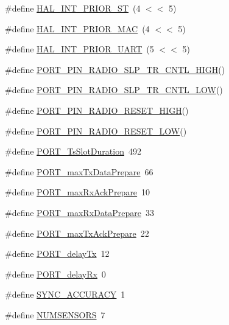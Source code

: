 \begin{DoxyCompactItemize}
\item 
\#define \hyperlink{_open_mote-_c_c2538_2board__info_8h_ac44de6592dd31fb9dca9d1a954bcc1b7}{H\+A\+L\+\_\+\+I\+N\+T\+\_\+\+P\+R\+I\+O\+R\+\_\+\+ST}~(4 $<$$<$ 5)
\item 
\#define \hyperlink{_open_mote-_c_c2538_2board__info_8h_a77976bed781c3a55d6a51a9ef8390fd2}{H\+A\+L\+\_\+\+I\+N\+T\+\_\+\+P\+R\+I\+O\+R\+\_\+\+M\+AC}~(4 $<$$<$ 5)
\item 
\#define \hyperlink{_open_mote-_c_c2538_2board__info_8h_a730d3ece8ddd2cd188b4c6bc3d91d0ac}{H\+A\+L\+\_\+\+I\+N\+T\+\_\+\+P\+R\+I\+O\+R\+\_\+\+U\+A\+RT}~(5 $<$$<$ 5)
\item 
\#define \hyperlink{_open_mote-_c_c2538_2board__info_8h_ae0ff27a9c8d9263aa7ceee7ba581280c}{P\+O\+R\+T\+\_\+\+P\+I\+N\+\_\+\+R\+A\+D\+I\+O\+\_\+\+S\+L\+P\+\_\+\+T\+R\+\_\+\+C\+N\+T\+L\+\_\+\+H\+I\+GH}()
\item 
\#define \hyperlink{_open_mote-_c_c2538_2board__info_8h_a7ae0b80772b90445a990f123fb4b19e4}{P\+O\+R\+T\+\_\+\+P\+I\+N\+\_\+\+R\+A\+D\+I\+O\+\_\+\+S\+L\+P\+\_\+\+T\+R\+\_\+\+C\+N\+T\+L\+\_\+\+L\+OW}()
\item 
\#define \hyperlink{_open_mote-_c_c2538_2board__info_8h_aa9d96d7a8219fd2ad5e61e577807b781}{P\+O\+R\+T\+\_\+\+P\+I\+N\+\_\+\+R\+A\+D\+I\+O\+\_\+\+R\+E\+S\+E\+T\+\_\+\+H\+I\+GH}()    
\item 
\#define \hyperlink{_open_mote-_c_c2538_2board__info_8h_aeca79a9bd28583f34f57583b6045b3cd}{P\+O\+R\+T\+\_\+\+P\+I\+N\+\_\+\+R\+A\+D\+I\+O\+\_\+\+R\+E\+S\+E\+T\+\_\+\+L\+OW}()      
\item 
\#define \hyperlink{_open_mote-_c_c2538_2board__info_8h_a753468943519d7d3ed61ea7134df2f11}{P\+O\+R\+T\+\_\+\+Ts\+Slot\+Duration}~492
\item 
\#define \hyperlink{_open_mote-_c_c2538_2board__info_8h_af45f329a1d2c1097af1d022b6363b0ed}{P\+O\+R\+T\+\_\+max\+Tx\+Data\+Prepare}~66
\item 
\#define \hyperlink{_open_mote-_c_c2538_2board__info_8h_a238f21ff0cb8bed569124960f22f882e}{P\+O\+R\+T\+\_\+max\+Rx\+Ack\+Prepare}~10
\item 
\#define \hyperlink{_open_mote-_c_c2538_2board__info_8h_a9e21d179374e68398446ff4353ad8318}{P\+O\+R\+T\+\_\+max\+Rx\+Data\+Prepare}~33
\item 
\#define \hyperlink{_open_mote-_c_c2538_2board__info_8h_a8c4fcdb6e44dcf5103f7f727b2cf42b8}{P\+O\+R\+T\+\_\+max\+Tx\+Ack\+Prepare}~22
\item 
\#define \hyperlink{_open_mote-_c_c2538_2board__info_8h_ad5778702c9656470618b2d8c1c82423a}{P\+O\+R\+T\+\_\+delay\+Tx}~12
\item 
\#define \hyperlink{_open_mote-_c_c2538_2board__info_8h_a26ca518d2e84908d5486fe5d5d384f52}{P\+O\+R\+T\+\_\+delay\+Rx}~0
\item 
\#define \hyperlink{_open_mote-_c_c2538_2board__info_8h_a190d1e774c272ae302ed98c400694f9a}{S\+Y\+N\+C\+\_\+\+A\+C\+C\+U\+R\+A\+CY}~1
\item 
\#define \hyperlink{_open_mote-_c_c2538_2board__info_8h_a464fdb7834b9b30e4c1dfdf1134cd8cb}{N\+U\+M\+S\+E\+N\+S\+O\+RS}~7
\end{DoxyCompactItemize}


